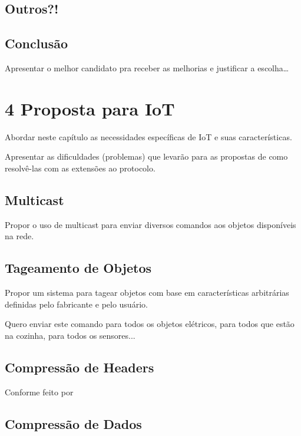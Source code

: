 \documentclass[twoside,english,brazilian]{UNISINOSmonografia}
\begin{document}
	
	\section{Outros?!}
	
	
	\section{Conclusão}
	
		Apresentar o melhor candidato pra receber as melhorias e justificar
		a escolha\ldots



\chapter{4 Proposta para IoT}

	Abordar neste capítulo as necessidades específicas de IoT e suas 
	características.
	
	Apresentar as dificuldades (problemas) que levarão para as propostas
	de como resolvê-las com as extensões ao protocolo.
	
	
	\section{Multicast}
		
		Propor o uso de multicast para enviar diversos comandos aos objetos
		disponíveis na rede.
		
		
	\section{Tageamento de Objetos}
		
		Propor um sistema para tagear objetos com base em características
		arbitrárias definidas pelo fabricante e pelo usuário.
		
		Quero enviar este comando para todos os objetos elétricos, para
		todos que estão na cozinha, para todos os sensores...
		
		
	\section{Compressão de Headers}
		
		Conforme feito por \cite{Choi2009}
		
		
	\section{Compressão de Dados}
		
\end{document}
